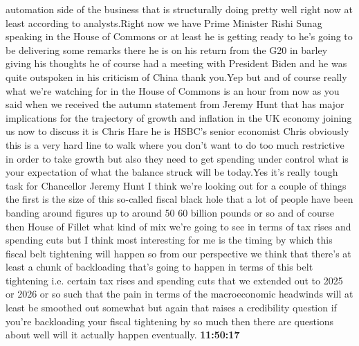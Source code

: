 \documentclass{article}%
\begin{document}
automation side of the business that is structurally doing pretty well right now at least according to analysts.Right now we have Prime Minister Rishi Sunag speaking in the House of Commons or at least he is getting ready to he's going to be delivering some remarks there he is on his return from the G20 in barley giving his thoughts he of course had a meeting with President Biden and he was quite outspoken in his criticism of China thank you.Yep but and of course really what we're watching for in the House of Commons is an hour from now as you said when we received the autumn statement from Jeremy Hunt that has major implications for the trajectory of growth and inflation in the UK economy joining us now to discuss it is Chris Hare he is HSBC's senior economist Chris obviously this is a very hard line to walk where you don't want to do too much restrictive in order to take growth but also they need to get spending under control what is your expectation of what the balance struck will be today.Yes it's really tough task for Chancellor Jeremy Hunt I think we're looking out for a couple of things the first is the size of this so{-}called fiscal black hole that a lot of people have been banding around figures up to around 50 60 billion pounds or so and of course then House of Fillet what kind of mix we're going to see in terms of tax rises and spending cuts but I think most interesting for me is the timing by which this fiscal belt tightening will happen so from our perspective we think that there's at least a chunk of backloading that's going to happen in terms of this belt tightening i.e. certain tax rises and spending cuts that we extended out to 2025 or 2026 or so such that the pain in terms of the macroeconomic headwinds will at least be smoothed out somewhat but again that raises a credibility question if you're backloading your fiscal tightening by so much then there are questions about well will it actually happen eventually.%
\textbf{11:50:17}%
\newline%
\end{document}
